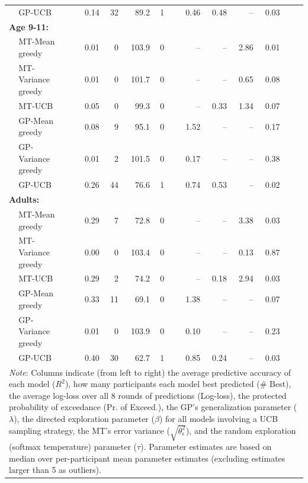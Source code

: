 \begin{table}[ht!]
{\begin{tabular}{llrrrrrrrrrrrr}
 & GP-UCB             && 0.14 & 32 & 89.2  & 1 &  & 0.46 & 0.48 & --    & 0.03\\
\multicolumn{2}{l}{\textbf{Age 9-11:}}&&&&&&&  &  &      &      &      &     \\
 & MT-Mean greedy     && 0.01 & 0  & 103.9  & 0 &  &  --   & --    & 2.86 & 0.01\\
 & MT-Variance greedy && 0.01 & 0  & 101.7 & 0 &  &  --   & --    & 0.65 & 0.08\\
 & MT-UCB             && 0.05 & 0  & 99.3  & 0 &  &  --   & 0.33 & 1.34 & 0.07\\
 & GP-Mean greedy     && 0.08 & 9  & 95.1  & 0 &  & 1.52 & --    & --    & 0.17\\
 & GP-Variance greedy && 0.01 & 2  & 101.5 & 0 &  & 0.17 & --    & --    & 0.38\\
 & GP-UCB             && 0.26 & 44 & 76.6  & 1 &  & 0.74 & 0.53 & --    & 0.02\\
\multicolumn{2}{l}{\textbf{Adults:}} &&  &  &  &  &  &  &  &  &  &  & \\
 & MT-Mean greedy     && 0.29 & 7  & 72.8  & 0 &  &  --   & --    & 3.38 & 0.03\\
 & MT-Variance greedy && 0.00 & 0  & 103.4 & 0 &  &  --   & --    & 0.13 & 0.87\\
 & MT-UCB             && 0.29 & 2  & 74.2  & 0 &  &  --   & 0.18 & 2.94 & 0.03\\
 & GP-Mean greedy     && 0.33 & 11 & 69.1  & 0 &  & 1.38 & --    & --    & 0.07\\
 & GP-Variance greedy && 0.01 & 0  & 103.9 & 0 &  & 0.10 & --    & --    & 0.23\\
 & GP-UCB             && 0.40 & 30 & 62.7  & 1 &   & 0.85 & 0.24 & --    & 0.03\\
 \midrule
 \multicolumn{14}{p{18cm}}{\textit{Note}: Columns indicate (from left to right) the average predictive accuracy of each model ($R^2$), how many participants each model best predicted  (\# Best), the average log-loss over all 8 rounds of predictions (Log-loss), the protected probability of exceedance (Pr. of Exceed.), the GP's generalization parameter ($\lambda$), the directed exploration parameter ($\beta$) for all models involving a UCB sampling strategy, the MT's error variance ($\sqrt{\theta_\epsilon^2}$), and the random exploration (softmax temperature) parameter ($\tau$). Parameter estimates are based on median over per-participant mean parameter estimates (excluding estimates larger than 5 as outliers).}\\
\bottomrule
\end{tabular}}
\end{table}
